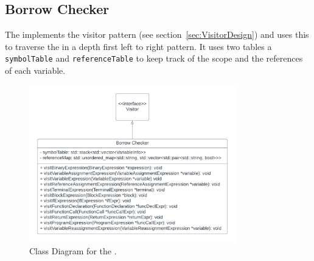 \subsection{Borrow Checker}
\label{sec:BorrowCheckerDesign}

The \borrowChecker{} implements the visitor pattern (see
section~\ref{sec:VisitorDesign}) and uses this to traverse the \ast{} in a depth first
left to right pattern. It uses two tables a \texttt{symbolTable} and
\texttt{referenceTable} to keep track of the scope and the
references of each variable.

\begin{figure}[ht]
  \centering
  \includegraphics[width=0.8\textwidth]{02-Body/Design/Images/BorrowChecker.png}
  \caption{Class Diagram for the \borrowchecker.}
  \label{fig:borrowcheckerUML}
\end{figure}


